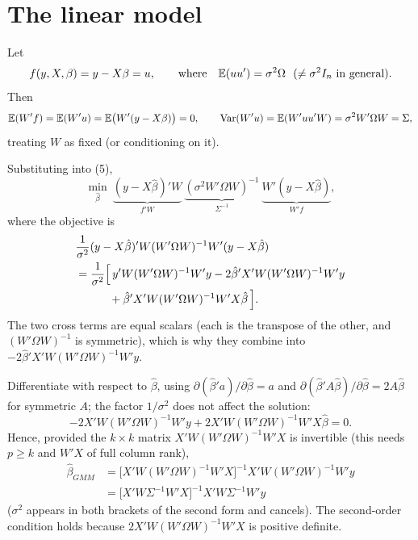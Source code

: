 \documentclass[11pt]{article}
\begin{document}
\section{The linear model}

Let
\[ f(y,X,\beta)=y-X\beta=u,\qquad\text{where}\quad \mathbb{E}(uu')=\sigma^{2}\Omega\ \ (\neq\sigma^{2}I_{n}\text{ in general}). \]
Then
\[ \mathbb{E}(W'f)=\mathbb{E}(W'u)=\mathbb{E}\bigl(W'(y-X\beta)\bigr)=0, \qquad
   \operatorname{Var}(W'u)=\mathbb{E}(W'uu'W)=\sigma^{2}W'\Omega W=\Sigma , \]
treating $W$ as fixed (or conditioning on it).

Substituting into (5),
\[ \min_{\hat\beta}\ \underbrace{(y-X\hat\beta)'W}_{f'W}\ \underbrace{(\sigma^{2}W'\Omega W)^{-1}}_{\Sigma^{-1}}\ \underbrace{W'(y-X\hat\beta)}_{W'f}, \]
where the objective is
\begin{align*}
 &\frac{1}{\sigma^{2}}(y-X\hat\beta)'W(W'\Omega W)^{-1}W'(y-X\hat\beta) \\
 &=\frac{1}{\sigma^{2}}\Bigl[\,y'W(W'\Omega W)^{-1}W'y-2\hat\beta'X'W(W'\Omega W)^{-1}W'y \\
 &\hphantom{=\frac{1}{\sigma^{2}}\Bigl[\,}+\hat\beta'X'W(W'\Omega W)^{-1}W'X\hat\beta\,\Bigr].
\end{align*}
The two cross terms are equal scalars (each is the transpose of the other, and $(W'\Omega W)^{-1}$ is
symmetric), which is why they combine into $-2\hat\beta'X'W(W'\Omega W)^{-1}W'y$.

Differentiate with respect to $\hat\beta$, using $\partial(\hat\beta'a)/\partial\hat\beta=a$ and
$\partial(\hat\beta'A\hat\beta)/\partial\hat\beta=2A\hat\beta$ for symmetric $A$; the factor $1/\sigma^{2}$ does not
affect the solution:
\[ -2X'W(W'\Omega W)^{-1}W'y+2X'W(W'\Omega W)^{-1}W'X\hat\beta=0 . \]
Hence, provided the $k\times k$ matrix $X'W(W'\Omega W)^{-1}W'X$ is invertible (this needs $p\ge k$ and
$W'X$ of full column rank),
\begin{equation}\tag{6}
 \boxed{\begin{aligned}
 \hat\beta_{GMM}&=\bigl[X'W(W'\Omega W)^{-1}W'X\bigr]^{-1}X'W(W'\Omega W)^{-1}W'y\\
 &=\bigl[X'W\Sigma^{-1}W'X\bigr]^{-1}X'W\Sigma^{-1}W'y
 \end{aligned}}
\end{equation}
($\sigma^{2}$ appears in both brackets of the second form and cancels). The second-order condition holds
because $2X'W(W'\Omega W)^{-1}W'X$ is positive definite.
\end{document}
